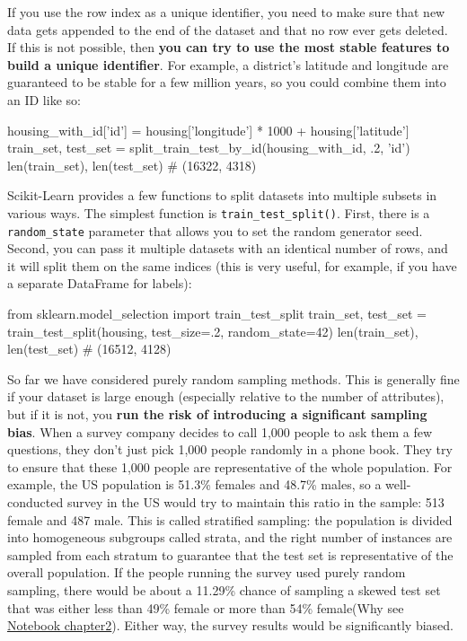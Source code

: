 If you use the row index as a unique identifier, you need to make sure that new data
gets appended to the end of the dataset and that no row ever gets deleted. If this is not
possible, then \textbf{you can try to use the most stable features to build a unique identifier}. For example, a district’s latitude and longitude are guaranteed to be stable for a few
million years, so you could combine them into an ID like so:

\begin{pyc}
housing_with_id['id'] = housing['longitude'] * 1000 + housing['latitude']
train_set, test_set = split_train_test_by_id(housing_with_id, .2, 'id')
len(train_set), len(test_set)
# (16322, 4318)
\end{pyc}

Scikit-Learn provides a few functions to split datasets into multiple subsets in various
ways. The simplest function is \verb|train_test_split()|. First, there is a \verb|random_state| parameter that allows you to set the random generator
seed. Second, you can pass it multiple datasets with an identical number of rows, and
it will split them on the same indices (this is very useful, for example, if you have a
separate DataFrame for labels):
\begin{pyc}
from sklearn.model_selection import train_test_split
train_set, test_set = train_test_split(housing, test_size=.2, random_state=42)
len(train_set), len(test_set)
# (16512, 4128)
\end{pyc}

So far we have considered purely random sampling methods. This is generally fine if
your dataset is large enough (especially relative to the number of attributes), but if it
is not, you \textbf{run the risk of introducing a significant sampling bias}. When a survey
company decides to call 1,000 people to ask them a few questions, they don’t just pick
1,000 people randomly in a phone book. They try to ensure that these 1,000 people
are representative of the whole population. For example, the US population is 51.3\%
females and 48.7\% males, so a well-conducted survey in the US would try to maintain
this ratio in the sample: 513 female and 487 male. This is called stratified sampling:
the population is divided into homogeneous subgroups called strata, and the right
number of instances are sampled from each stratum to guarantee that the test set is
representative of the overall population. If the people running the survey used purely
random sampling, there would be about a 11.29\% chance of sampling a skewed test set that was either less than 49\% female or more than 54\% female(Why see \href{https://github.com/JPL-JUNO/HOML/blob/main/chapter/chapter2.ipynb}{Notebook chapter2}). Either way, the survey results would be significantly biased.


